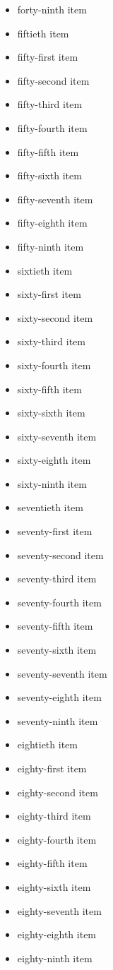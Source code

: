 \documentclass[11pt,letterpaper,oldstylefigures]{memoir}
\begin{document}
\begin{itemize}
\item forty-ninth item
\item fiftieth item
\item fifty-first item
\item fifty-second item
\item fifty-third item
\item fifty-fourth item
\item fifty-fifth item
\item fifty-sixth item
\item fifty-seventh item
\item fifty-eighth item
\item fifty-ninth item
\item sixtieth item
\item sixty-first item
\item sixty-second item
\item sixty-third item
\item sixty-fourth item
\item sixty-fifth item
\item sixty-sixth item
\item sixty-seventh item
\item sixty-eighth item
\item sixty-ninth item
\item seventieth item
\item seventy-first item
\item seventy-second item
\item seventy-third item
\item seventy-fourth item
\item seventy-fifth item
\item seventy-sixth item
\item seventy-seventh item
\item seventy-eighth item
\item seventy-ninth item
\item eightieth item
\item eighty-first item
\item eighty-second item
\item eighty-third item
\item eighty-fourth item
\item eighty-fifth item
\item eighty-sixth item
\item eighty-seventh item
\item eighty-eighth item
\item eighty-ninth item

\end{itemize}
\end{document}
